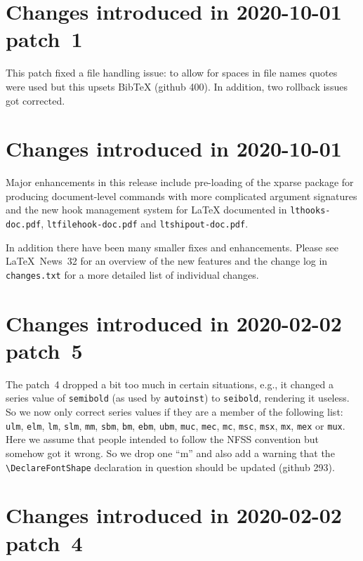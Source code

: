 \documentclass{ltxguide}
\newcommand\Lpack[1]{\mbox{\textsf{#1}}}
\newcommand\ghissue[1]{github #1}
\newcommand\ltnewsissue[1]{\LaTeX\ News~#1}
\newcommand\ghissue[1]{%
    \href{https://github.com/latex3/latex2e/issues/#1}{github #1}}
\newcommand\ltnewsissue[1]{%
    \href{https://www.latex-project.org/news/latex2e-news/ltnews#1.pdf}{\LaTeX\ News~#1}}
\begin{document}
\section{Changes introduced in 2020-10-01 patch~1}

This patch fixed a file handling issue: to allow for spaces in file
names quotes were used but this upsets Bib\TeX{} (\ghissue{400}).  In
addition, two rollback issues got corrected.

\section{Changes introduced in 2020-10-01}

Major enhancements in this release include pre-loading of the
\Lpack{xparse} package for producing document-level commands with more
complicated argument signatures and the new hook management system for
\LaTeX{} documented in \texttt{lthooks-doc.pdf},
\texttt{ltfilehook-doc.pdf} and \texttt{ltshipout-doc.pdf}.

In addition there have been many smaller fixes and enhancements.
Please see \ltnewsissue{32} for an overview of the new features and
the change log in \texttt{changes.txt} for a more detailed list of
individual changes.

\section{Changes introduced in 2020-02-02 patch~5}

The patch~4 dropped a bit too much in certain situations, e.g., it
changed a series value of \texttt{semibold} (as used by
\texttt{autoinst}) to \texttt{seibold}, rendering it useless. So we
now only correct series values if they are a member of the
following list: \texttt{ulm}, \texttt{elm}, \texttt{lm}, \texttt{slm},
\texttt{mm}, \texttt{sbm}, \texttt{bm}, \texttt{ebm}, \texttt{ubm},
\texttt{muc}, \texttt{mec}, \texttt{mc}, \texttt{msc}, \texttt{msx},
\texttt{mx}, \texttt{mex} or \texttt{mux}. Here we assume that people
intended to follow the NFSS convention but somehow got it wrong. So we
drop one ``m'' and also add a warning that the
\verb=\DeclareFontShape= declaration in question should be updated
(\ghissue{293}).


\section{Changes introduced in 2020-02-02 patch~4}
\end{document}

